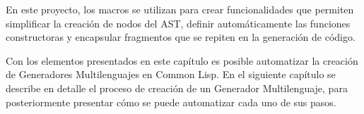 En este proyecto, los macros se utilizan para crear funcionalidades que permiten simplificar la creación de nodos del AST, definir automáticamente las funciones constructoras y encapsular fragmentos que se repiten en la generación de código. 

Con los elementos presentados en este capítulo es posible automatizar la creación de Generadores Multilenguajes en Common Lisp. En el siguiente capítulo se describe en detalle el proceso de creación de un Generador Multilenguaje, para posteriormente presentar cómo se puede automatizar cada uno de sus pasos.

%


